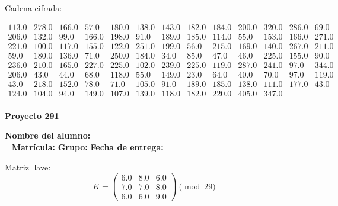 \documentclass[12pt]{article}
\begin{document}
Cadena cifrada:
\begin{center}
$\begin{array}{lllllllllllll}
113.0 & 278.0 & 166.0 & 57.0 & 180.0 & 138.0 & 143.0 & 182.0 & 184.0 & 200.0 & 320.0 & 286.0 & 69.0\\
206.0 & 132.0 & 99.0 & 166.0 & 198.0 & 91.0 & 189.0 & 185.0 & 114.0 & 55.0 & 153.0 & 166.0 & 271.0\\
221.0 & 100.0 & 117.0 & 155.0 & 122.0 & 251.0 & 199.0 & 56.0 & 215.0 & 169.0 & 140.0 & 267.0 & 211.0\\
59.0 & 180.0 & 136.0 & 71.0 & 250.0 & 184.0 & 34.0 & 85.0 & 47.0 & 46.0 & 225.0 & 155.0 & 90.0\\
236.0 & 210.0 & 165.0 & 227.0 & 225.0 & 102.0 & 239.0 & 225.0 & 119.0 & 287.0 & 241.0 & 97.0 & 344.0\\
206.0 & 43.0 & 44.0 & 68.0 & 118.0 & 55.0 & 149.0 & 23.0 & 64.0 & 40.0 & 70.0 & 97.0 & 119.0\\
43.0 & 218.0 & 152.0 & 78.0 & 71.0 & 105.0 & 91.0 & 189.0 & 185.0 & 138.0 & 111.0 & 177.0 & 43.0\\
124.0 & 104.0 & 94.0 & 149.0 & 107.0 & 139.0 & 118.0 & 182.0 & 220.0 & 405.0 & 347.0\\
\end{array}$
\end{center}

\newpage


\textbf{Proyecto 291}

\textbf{Nombre del alumno:} \underline{\hspace{13cm}}\\\
\vspace{1cm}
\textbf{Matrícula:} \underline{\hspace{4cm}} \hspace{1cm}
\textbf{Grupo:} \underline{\hspace{2cm}}
\textbf{Fecha de entrega:} \underline{\hspace{2cm}}

\medskip

Matriz llave:
\[
K = \begin{pmatrix}
6.0 & 8.0 & 6.0\\
7.0 & 7.0 & 8.0\\
6.0 & 6.0 & 9.0
\end{pmatrix} \pmod{29}
\]
\end{document}
